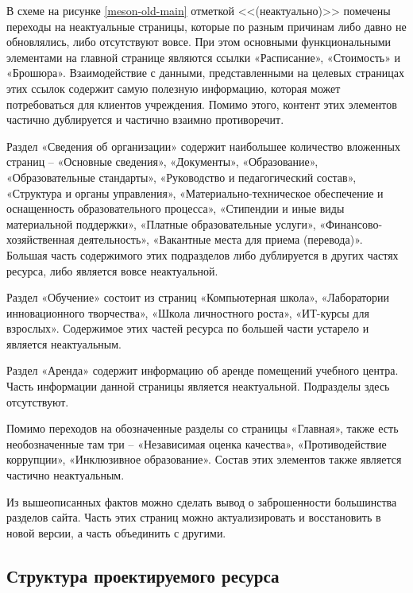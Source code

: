 
В схеме на рисунке \ref{meson-old-main} отметкой <<(неактуально)>> помечены переходы на неактуальные страницы, которые по разным причинам либо давно не обновлялись, либо отсутствуют вовсе.
При этом основными функциональными элементами на главной странице являются ссылки «Расписание», «Стоимость» и «Брошюра».
Взаимодействие с данными, представленными на целевых страницах этих ссылок содержит самую полезную информацию, которая может потребоваться для клиентов учреждения.
Помимо этого, контент этих элементов частично дублируется и частично взаимно противоречит.

Раздел «Сведения об организации» содержит наибольшее количество вложенных страниц -- «Основные сведения», «Документы», «Образование», «Образовательные стандарты», «Руководство и педагогический состав», «Структура и органы управления», «Материально-техническое обеспечение и оснащенность образовательного процесса», «Стипендии и иные виды материальной поддержки», «Платные образовательные услуги», «Финансово-хозяйственная деятельность», «Вакантные места для приема (перевода)».
Большая часть содержимого этих подразделов либо дублируется в других частях ресурса, либо является вовсе неактуальной.

Раздел «Обучение» состоит из страниц «Компьютерная школа», «Лаборатории инновационного творчества», «Школа личностного роста», «ИТ-курсы для взрослых».
Содержимое этих частей ресурса по большей части устарело и является неактуальным.

Раздел «Аренда» содержит информацию об аренде помещений учебного центра.
Часть информации данной страницы является неактуальной.
Подразделы здесь отсутствуют.

Помимо переходов на обозначенные разделы со страницы «Главная», также есть необозначенные там три -- «Независимая оценка качества», «Противодействие коррупции», «Инклюзивное образование».
Состав этих элементов также является частично неактуальным.


Из вышеописанных фактов можно сделать вывод о заброшенности большинства разделов сайта.
Часть этих страниц можно актуализировать и восстановить в новой версии, а часть объединить с другими.


\subsection{Структура проектируемого ресурса}

